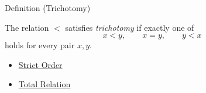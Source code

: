\begin{definitionbox}{Definition (Trichotomy)}
\begin{definition}[Trichotomy]
\label{def:trichotomy}
The relation $<$ satisfies \emph{trichotomy} if exactly one of
\[
x<y,\qquad x=y,\qquad y<x
\]
holds for every pair $x,y$.
\end{definition}
\end{definitionbox}

\begin{dependencies}
\begin{itemize}
  \item \hyperref[def:strict-order]{Strict Order}
  \item \hyperref[def:total-rel]{Total Relation}
\end{itemize}
\end{dependencies}
